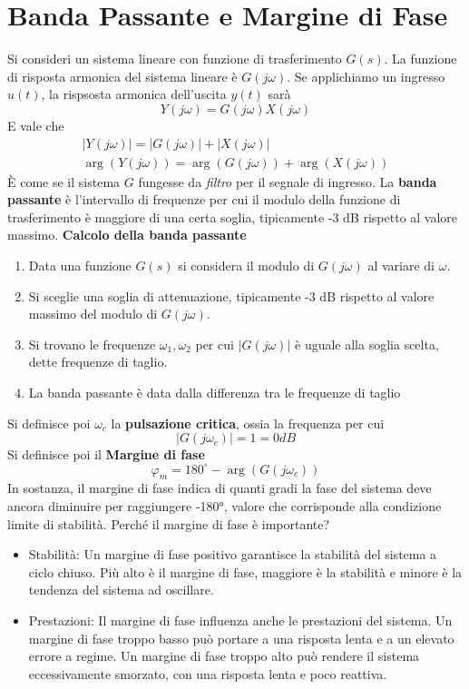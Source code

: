 \documentclass[10pt, letterpaper]{report}
\begin{document}
\section{Banda Passante e Margine di Fase}\label{bandaPass}
Si consideri un sistema lineare con funzione di trasferimento $G(s)$. La
funzione di risposta armonica del sistema lineare è $G(j\omega)$.\acc 
Se applichiamo un ingresso $u(t)$, la rispsosta armonica dell'uscita $y(t)$ sarà $$ Y(j\omega)=G(j\omega)X(j\omega)$$
E vale che 
$$ \begin{matrix}
  |Y(j\omega)|=   |G(j\omega)|+|X(j\omega)|
\\
\arg(Y(j\omega))=\arg(G(j\omega))+\arg(X(j\omega))
\end{matrix}$$
È come se il sistema $G$ fungesse da \textit{filtro} per il segnale di ingresso. La \textbf{banda passante} è l'intervallo di frequenze per cui il modulo della funzione di trasferimento è maggiore di una certa soglia, tipicamente -3 dB rispetto al valore massimo.\acc 
\textbf{Calcolo della banda passante}\begin{enumerate}
    \item Data una funzione $G(s)$ si considera il modulo di $G(j\omega)$ al variare di $\omega$.
    \item Si sceglie una soglia di attenuazione, tipicamente -3 dB rispetto al valore massimo del modulo di $G(j\omega)$. 
    \item Si trovano le frequenze $\omega_1,\omega_2$ per cui $|G(j\omega)|$ è uguale alla soglia scelta, dette frequenze di taglio.
    \item La banda passante è data dalla differenza tra le frequenze di taglio
\end{enumerate}
Si definisce poi $\omega_c$ la \textbf{pulsazione critica}, ossia la frequenza per cui 
$$|G(j\omega_c)|=1=0dB$$
Si definisce poi il \textbf{Margine di fase}
$$ \varphi_m=180^\circ-\arg(G(j\omega_c))$$
In sostanza, il margine di fase indica di quanti gradi la fase del sistema deve ancora diminuire per raggiungere -180°, valore che corrisponde alla condizione limite di stabilità.
Perché il margine di fase è importante?\begin{itemize}
    \item Stabilità: Un margine di fase positivo garantisce la stabilità del sistema a ciclo chiuso. Più alto è il margine di fase, maggiore è la stabilità e minore è la tendenza del sistema ad oscillare.
    \item Prestazioni: Il margine di fase influenza anche le prestazioni del sistema. Un margine di fase troppo basso può portare a una risposta lenta e a un elevato errore a regime. Un margine di fase troppo alto può rendere il sistema eccessivamente smorzato, con una risposta lenta e poco reattiva.
\end{itemize}
\end{document}
